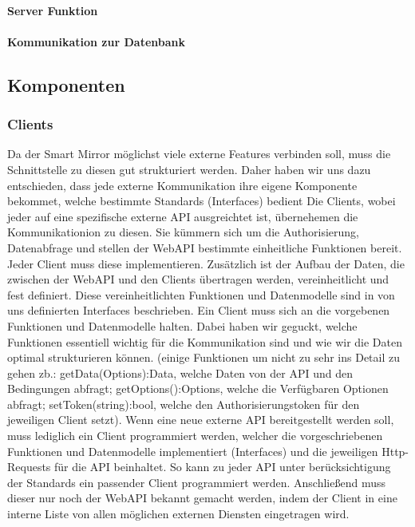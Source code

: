 \paragraph{Server Funktion}

\paragraph{Kommunikation zur Datenbank}


\subsection{Komponenten}\label{Komponenten}
\subsubsection{Clients}\label{Clients}
Da der Smart Mirror möglichst viele externe Features verbinden soll, muss die Schnittstelle zu diesen gut strukturiert werden. Daher haben wir uns dazu entschieden, dass jede externe Kommunikation ihre eigene Komponente bekommet, welche bestimmte Standards (Interfaces) bedient
Die Clients, wobei jeder auf eine spezifische externe API ausgreichtet ist, übernehemen die Kommunikationion zu diesen. Sie kümmern sich um die Authorisierung, Datenabfrage und stellen der WebAPI bestimmte einheitliche Funktionen bereit. Jeder Client muss diese implementieren. Zusätzlich ist der Aufbau der Daten, die zwischen der WebAPI und den Clients übertragen werden, vereinheitlicht und fest definiert. Diese vereinheitlichten Funktionen und Datenmodelle sind in von uns definierten Interfaces beschrieben. Ein Client muss sich an die vorgebenen Funktionen und Datenmodelle halten. Dabei haben wir geguckt, welche Funktionen essentiell wichtig für die Kommunikation sind und wie wir die Daten optimal strukturieren können. (einige Funktionen um nicht zu sehr ins Detail zu gehen zb.: getData(Options):Data, welche Daten von der API und den Bedingungen abfragt; getOptions():Options, welche die Verfügbaren Optionen abfragt; setToken(string):bool, welche den Authorisierungstoken für den jeweiligen Client setzt). Wenn eine neue externe API bereitgestellt werden soll, muss lediglich ein Client programmiert werden, welcher die vorgeschriebenen Funktionen und Datenmodelle implementiert (Interfaces) und die jeweiligen Http-Requests für die API beinhaltet. So kann zu jeder API unter berücksichtigung der Standards ein passender Client programmiert werden. Anschließend muss dieser nur noch der WebAPI bekannt gemacht werden, indem der Client in eine interne Liste von allen möglichen externen Diensten eingetragen wird.\\\
